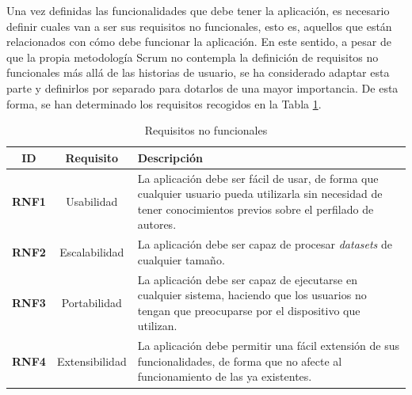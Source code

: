 Una vez definidas las funcionalidades que debe tener la aplicación, es necesario definir cuales van a ser sus requisitos
no funcionales, esto es, aquellos que están relacionados con cómo debe funcionar la aplicación. En este sentido, a pesar
de que la propia metodología Scrum no contempla la definición de requisitos no funcionales más allá de las historias de usuario,
se ha considerado adaptar esta parte y definirlos por separado para dotarlos de una mayor importancia.
De esta forma, se han determinado los requisitos recogidos en la Tabla \ref{tab:requisitos_no_funcionales}.

\bigskip
\begin{table}[hp!]
	\centering
	\begin{tabular}{|c|c|p{7.5cm}|}
		\rowcolor{udcpink!25}
		\hline
		\small \textbf{ID}                    & \small \textbf{Requisito} & \small \textbf{Descripción}                                                                      \\\hline
		\small \textbf{RNF1} \label{req:rnf1} & \small Usabilidad         & \small La aplicación debe ser fácil de usar, de forma que cualquier usuario pueda utilizarla sin
		necesidad de tener conocimientos previos sobre el perfilado de autores.                                                                                              \\\hline
		\small \textbf{RNF2} \label{req:rnf2} & \small Escalabilidad      & \small La aplicación debe ser capaz de procesar \textit{datasets} de cualquier tamaño.           \\\hline
		\small \textbf{RNF3} \label{req:rnf3} & \small Portabilidad       & \small La aplicación debe ser capaz de ejecutarse en cualquier sistema, haciendo que
		los usuarios no tengan que preocuparse por el dispositivo que utilizan.                                                                                              \\\hline
		\small \textbf{RNF4} \label{req:rnf4} & \small Extensibilidad     & \small La aplicación debe permitir una fácil extensión de sus funcionalidades, de forma que
		no afecte al funcionamiento de las ya existentes.                                                                                                                    \\\hline
	\end{tabular}
	\caption{Requisitos no funcionales}
	\label{tab:requisitos_no_funcionales}
\end{table}
